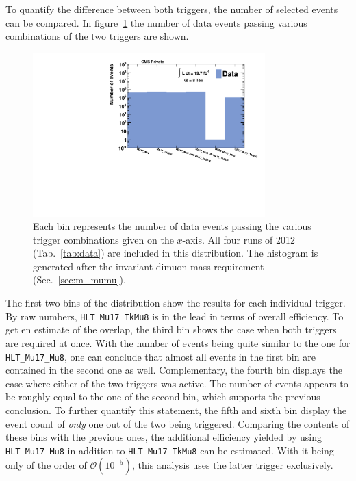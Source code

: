 To quantify the difference between both triggers, the number of selected events can be compared. In figure~\ref{fig:matched} the number of data events passing various combinations of the two triggers are shown.

\begin{figure}[ht!]
  \centering
    \includegraphics[width=0.8\textwidth]{plots/matched.pdf}
  \caption{Each bin represents the number of data events passing the various trigger combinations given on the $x$-axis. All four runs of 2012 (Tab.~\ref{tab:data}) are included in this distribution. The histogram is generated after the invariant dimuon mass requirement (Sec.~\ref{sec:m_mumu}).}
  \label{fig:matched}
\end{figure}

\noindent The first two bins of the distribution show the results for each individual trigger. By raw numbers, \verb+HLT_Mu17_TkMu8+ is in the lead in terms of overall efficiency. To get en estimate of the overlap, the third bin shows the case when both triggers are required at once. With the number of events being quite similar to the one for \verb+HLT_Mu17_Mu8+, one can conclude that almost all events in the first bin are contained in the second one as well. Complementary, the fourth bin displays the case where either of the two triggers was active. The number of events appears to be roughly equal to the one of the second bin, which supports the previous conclusion. To further quantify this statement, the fifth and sixth bin display the event count of \textit{only} one out of the two being triggered. Comparing the contents of these bins with the previous ones, the additional efficiency yielded by using \verb+HLT_Mu17_Mu8+ in addition to \verb+HLT_Mu17_TkMu8+ can be estimated. With it being only of the order of $\mathcal{O}(10^{-5})$, this analysis uses the latter trigger exclusively.


